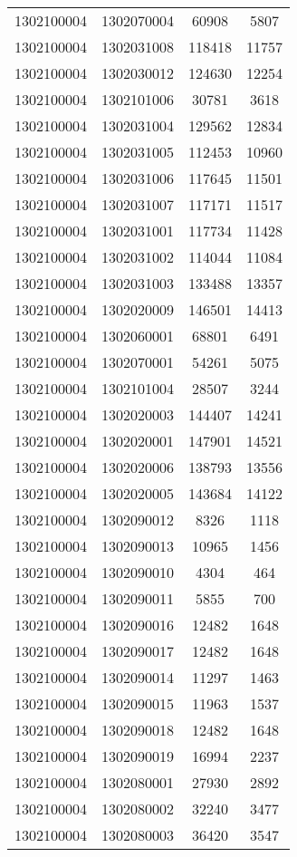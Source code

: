 \begin{longtable}[h]{llcc}
		1302100004 & 1302070004 & 60908 & 5807\\
		1302100004 & 1302031008 & 118418 & 11757\\
		1302100004 & 1302030012 & 124630 & 12254\\
		1302100004 & 1302101006 & 30781 & 3618\\
		1302100004 & 1302031004 & 129562 & 12834\\
		1302100004 & 1302031005 & 112453 & 10960\\
		1302100004 & 1302031006 & 117645 & 11501\\
		1302100004 & 1302031007 & 117171 & 11517\\
		1302100004 & 1302031001 & 117734 & 11428\\
		1302100004 & 1302031002 & 114044 & 11084\\
		1302100004 & 1302031003 & 133488 & 13357\\
		1302100004 & 1302020009 & 146501 & 14413\\
		1302100004 & 1302060001 & 68801 & 6491\\
		1302100004 & 1302070001 & 54261 & 5075\\
		1302100004 & 1302101004 & 28507 & 3244\\
		1302100004 & 1302020003 & 144407 & 14241\\
		1302100004 & 1302020001 & 147901 & 14521\\
		1302100004 & 1302020006 & 138793 & 13556\\
		1302100004 & 1302020005 & 143684 & 14122\\
		1302100004 & 1302090012 & 8326 & 1118\\
		1302100004 & 1302090013 & 10965 & 1456\\
		1302100004 & 1302090010 & 4304 & 464\\
		1302100004 & 1302090011 & 5855 & 700\\
		1302100004 & 1302090016 & 12482 & 1648\\
		1302100004 & 1302090017 & 12482 & 1648\\
		1302100004 & 1302090014 & 11297 & 1463\\
		1302100004 & 1302090015 & 11963 & 1537\\
		1302100004 & 1302090018 & 12482 & 1648\\
		1302100004 & 1302090019 & 16994 & 2237\\
		1302100004 & 1302080001 & 27930 & 2892\\
		1302100004 & 1302080002 & 32240 & 3477\\
		1302100004 & 1302080003 & 36420 & 3547\\

\end{longtable}
